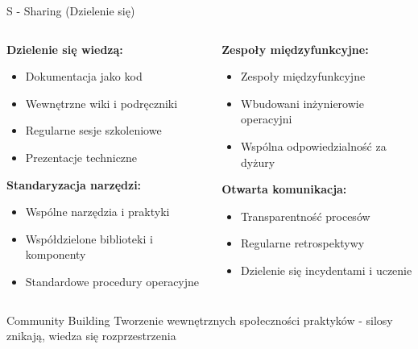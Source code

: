 \documentclass[10pt, aspectratio=169]{beamer}
\begin{document}
\begin{frame}{S - Sharing (Dzielenie się)}
\begin{columns}[T]
\begin{column}{0.5\textwidth}
\textbf{Dzielenie się wiedzą:}
\begin{itemize}
\item Dokumentacja jako kod
\item Wewnętrzne wiki i podręczniki
\item Regularne sesje szkoleniowe
\item Prezentacje techniczne
\end{itemize}

\textbf{Standaryzacja narzędzi:}
\begin{itemize}
\item Wspólne narzędzia i praktyki
\item Współdzielone biblioteki i komponenty
\item Standardowe procedury operacyjne
\end{itemize}
\end{column}
\begin{column}{0.5\textwidth}
\textbf{Zespoły międzyfunkcyjne:}
\begin{itemize}
\item Zespoły międzyfunkcyjne
\item Wbudowani inżynierowie operacyjni
\item Wspólna odpowiedzialność za dyżury
\end{itemize}

\textbf{Otwarta komunikacja:}
\begin{itemize}
\item Transparentność procesów
\item Regularne retrospektywy
\item Dzielenie się incydentami i uczenie
\end{itemize}
\end{column}
\end{columns}

\begin{block}{Community Building}
Tworzenie wewnętrznych społeczności praktyków - silosy znikają, wiedza się rozprzestrzenia
\end{block}
\end{frame}
\end{document}
